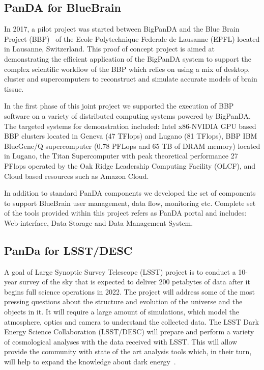\documentclass{webofc}
\begin{document}
\subsection{PanDA for BlueBrain} \label{section_bluebrain}

In 2017, a pilot project was started between BigPanDA and the Blue Brain Project (BBP)~\cite{Markram:BBP} of the Ecole Polytechnique Federale de Lausanne (EPFL) located in Lausanne, Switzerland. This proof of concept project is aimed at demonstrating the efficient application of the BigPanDA system to support the complex scientific workflow of the BBP which relies on using a mix of desktop, cluster and supercomputers to reconstruct and simulate accurate models of brain tissue.

In the first phase of this joint project we supported the execution of BBP software on a variety of distributed computing systems powered by BigPanDA. The targeted systems for demonstration included: Intel x86-NVIDIA GPU based BBP clusters located in Geneva (47 TFlops) and Lugano (81 TFlops), BBP IBM BlueGene/Q supercomputer (0.78 PFLops and 65 TB of DRAM memory) located in Lugano, the Titan Supercomputer with peak theoretical performance 27 PFlops operated by the Oak Ridge Leadership Computing Facility (OLCF), and Cloud based resources such as Amazon Cloud.

In addition to standard PanDA components we developed the set of components to support BlueBrain user management, data flow, monitoring etc. Complete set of the tools provided within this project refers as PanDA portal and includes: Web-interface, Data Storage and Data Management System. 


\subsection{PanDa for LSST/DESC} \label{section_lsst_desc}

A goal of Large Synoptic Survey Telescope (LSST) project is to conduct a 10-year survey of the sky that is expected to deliver 200 petabytes of data after it begins full science operations in 2022. The project will address some of the most pressing questions about the structure and evolution of the universe and the objects in it. It will require a large amount of simulations, which model the atmosphere, optics and camera to understand the collected data. The LSST Dark Energy Science Collaboration (LSST/DESC) will prepare and perform a variety of cosmological analyses with the data received with LSST. This will allow provide the community with state of the art analysis tools which, in their turn, will help to expand the knowledge about dark energy~\cite{lsst-desc}.
\end{document}
